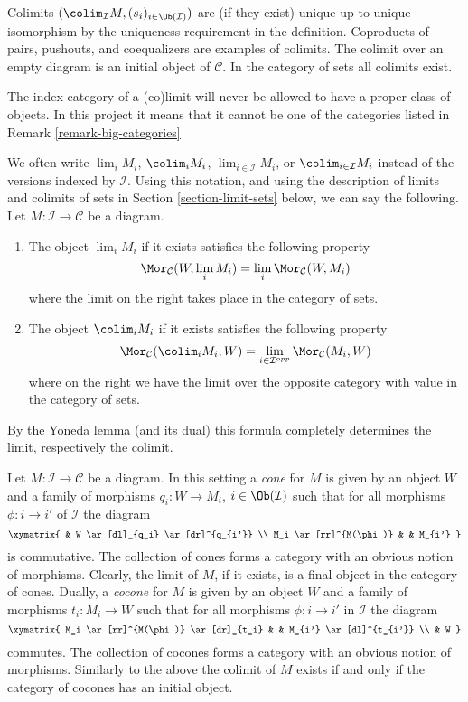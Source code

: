 \noindent
Colimits $(\colim_\mathcal{I} M, (s_i)_{i\in \Ob(\mathcal{I})})$ are
(if they exist) unique up to unique isomorphism by the uniqueness requirement
in the definition. Coproducts of pairs, pushouts, and coequalizers are
examples of colimits. The colimit over an empty diagram is an initial object
of $\mathcal{C}$. In the category of sets all colimits exist.

\begin{remark}
\label{remark-diagram-small}
The index category of a (co)limit will never be allowed to have
a proper class of objects. In this project it means that
it cannot be one of the categories listed in
Remark \ref{remark-big-categories}
\end{remark}

\begin{remark}
\label{remark-limit-colim}
We often write $\lim_i M_i$, $\colim_i M_i$,
$\lim_{i\in \mathcal{I}} M_i$, or $\colim_{i\in \mathcal{I}} M_i$
instead of the versions indexed by $\mathcal{I}$.
Using this notation, and using the description of
limits and colimits of sets in Section \ref{section-limit-sets}
below, we can say the following.
Let $M : \mathcal{I} \to \mathcal{C}$ be a diagram.
\begin{enumerate}
\item The object $\lim_i M_i$ if it exists satisfies the following property
$$
\Mor_\mathcal{C}(W, \lim_i M_i)
=
\lim_i \Mor_\mathcal{C}(W, M_i)
$$
where the limit on the right takes place in the category of sets.
\item The object $\colim_i M_i$ if it
exists satisfies the following property
$$
\Mor_\mathcal{C}(\colim_i M_i, W)
=
\lim_{i \in \mathcal{I}^{opp}} \Mor_\mathcal{C}(M_i, W)
$$
where on the right we have the limit over the opposite category
with value in the category of sets.
\end{enumerate}
By the Yoneda lemma (and its dual) this formula completely determines the
limit, respectively the colimit.
\end{remark}

\begin{remark}
\label{remark-cones-and-cocones}
Let $M : \mathcal{I} \to \mathcal{C}$ be a diagram. In this setting a
{\it cone} for $M$ is given by an object $W$ and a family of morphisms
$q_i : W \to M_i$, $i \in \Ob(\mathcal{I})$ such that for all morphisms
$\phi : i \to i'$ of $\mathcal{I}$ the diagram
$$
\xymatrix{
& W \ar[dl]_{q_i} \ar[dr]^{q_{i'}} \\
M_i \ar[rr]^{M(\phi)} & & M_{i'}
}
$$
is commutative. The collection of cones forms a category with an obvious
notion of morphisms. Clearly, the limit of $M$, if it exists, is a final
object in the category of cones. Dually, a {\it cocone} for $M$ is given
by an object $W$ and a family of morphisms $t_i : M_i \to W$ such that for
all morphisms $\phi : i \to i'$ in $\mathcal{I}$ the diagram
$$
\xymatrix{
M_i \ar[rr]^{M(\phi)} \ar[dr]_{t_i} & & M_{i'} \ar[dl]^{t_{i'}} \\
& W
}
$$
commutes. The collection of cocones forms a category with an obvious notion
of morphisms. Similarly to the above the colimit of $M$ exists
if and only if the category of cocones has an initial object.
\end{remark}

